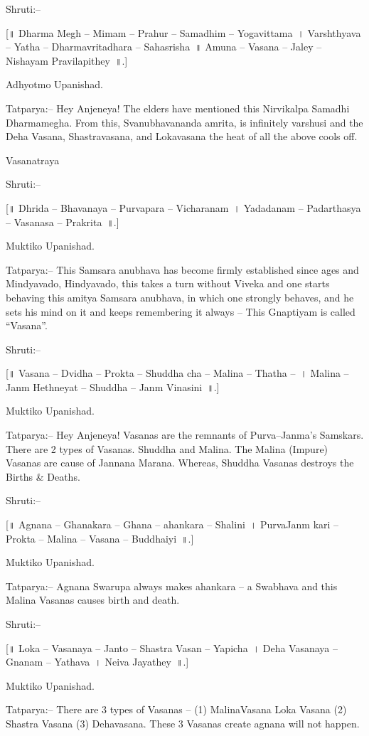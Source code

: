 Shruti:–

[॥ Dharma Megh – Mimam – Prahur – Samadhim – Yogavittama~। Varshthyava – Yatha – Dharmavritadhara – Sahasrisha~॥ Amuna – Vasana – Jaley – Nishayam Pravilapithey~॥.]

Adhyotmo Upanishad.

Tatparya:– Hey Anjeneya! The elders have mentioned this Nirvikalpa Samadhi Dharmamegha. From this, Svanubhavananda amrita, is infinitely varshusi and the Deha Vasana, Shastravasana, and Lokavasana the heat of all the above cools off.

Vasanatraya

Shruti:–

[॥ Dhrida – Bhavanaya – Purvapara – Vicharanam~। Yadadanam – Padarthasya – Vasanasa – Prakrita~॥.]

Muktiko Upanishad.

Tatparya:– This Samsara anubhava has become firmly established since ages and Mindyavado, Hindyavado, this takes a turn without Viveka and one starts behaving this amitya Samsara anubhava, in which one strongly behaves, and he sets his mind on it and keeps remembering it always – This Gnaptiyam is called “Vasana”.

Shruti:–

[॥ Vasana – Dvidha – Prokta – Shuddha cha – Malina – Thatha –~। Malina – Janm Hethneyat – Shuddha – Janm Vinasini~॥.]

Muktiko Upanishad.

Tatparya:– Hey Anjeneya! Vasanas are the remnants of Purva–Janma's Samskars. There are 2 types of Vasanas. Shuddha and Malina. The Malina (Impure) Vasanas are cause of Jannana Marana. Whereas, Shuddha Vasanas destroys the Births \& Deaths.

Shruti:–

[॥ Agnana – Ghanakara – Ghana – ahankara – Shalini~। PurvaJanm kari – Prokta – Malina – Vasana – Buddhaiyi~॥.]

Muktiko Upanishad.

Tatparya:– Agnana Swarupa always makes ahankara – a Swabhava and this Malina Vasanas causes birth and death.

Shruti:–

[॥ Loka – Vasanaya – Janto – Shastra Vasan – Yapicha~। Deha Vasanaya – Gnanam – Yathava~। Neiva Jayathey~॥.]

Muktiko Upanishad.

Tatparya:– There are 3 types of Vasanas – (1) MalinaVasana Loka Vasana (2) Shastra Vasana (3) Dehavasana. These 3 Vasanas create agnana will not happen.

